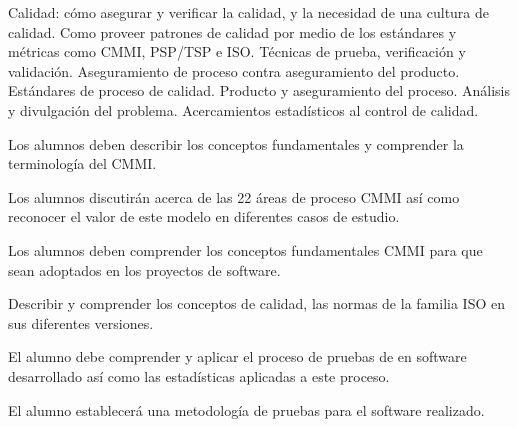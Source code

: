 \begin{syllabus}


\begin{justification}
Calidad: cómo asegurar y verificar la calidad, y la necesidad de una cultura de calidad. Como proveer patrones de
calidad por medio de los estándares y métricas como CMMI, PSP/TSP e ISO. Técnicas de prueba, verificación y validación.
Aseguramiento de proceso contra aseguramiento del producto. Estándares de proceso de calidad. Producto y
aseguramiento del proceso. Análisis y divulgación del problema. Acercamientos estadísticos al control de calidad.
\end{justification}

\begin{goals}
\item Los alumnos deben describir los conceptos fundamentales  y comprender la terminología del CMMI.
\item Los alumnos discutirán acerca de las 22 áreas de proceso CMMI así como reconocer el valor de este modelo en diferentes casos de estudio.
\item Los alumnos deben comprender los conceptos fundamentales  CMMI para que sean adoptados en los proyectos de software.
\item Describir y comprender los conceptos de calidad, las normas de la familia ISO en sus diferentes versiones.
\item El alumno debe comprender y aplicar el proceso de pruebas de en software desarrollado así como las estadísticas aplicadas a este proceso.
\item El alumno establecerá una metodología de pruebas para el software realizado.
\end{goals}

\begin{outcomes}
\end{outcomes}


\end{syllabus}
